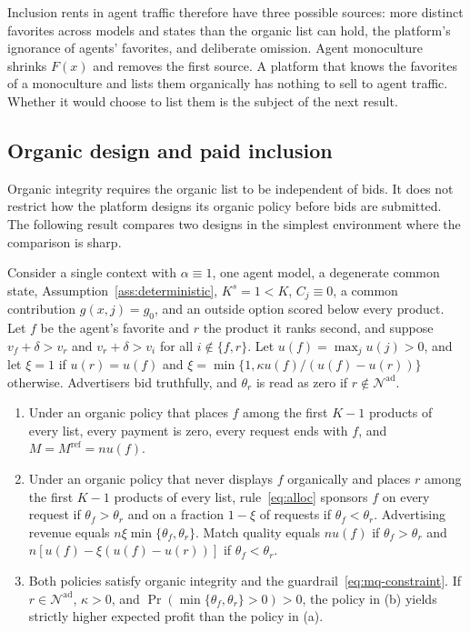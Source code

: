 \documentclass[opre,dblanonrev]{informs4}
\providecommand{\1}{\mathbf{1}}
\begin{document}
Inclusion rents in agent traffic therefore have three possible sources: more distinct favorites across models and states than the organic list can hold, the platform's ignorance of agents' favorites, and deliberate omission. Agent monoculture shrinks $F(x)$ and removes the first source. A platform that knows the favorites of a monoculture and lists them organically has nothing to sell to agent traffic. Whether it would choose to list them is the subject of the next result.

\subsection{Organic design and paid inclusion}\label{sec:mechanism-gating}

Organic integrity requires the organic list to be independent of bids. It does not restrict how the platform designs its organic policy before bids are submitted. The following result compares two designs in the simplest environment where the comparison is sharp.

\begin{proposition}\label{prop:gating}
Consider a single context with $\alpha\equiv1$, one agent model, a degenerate common state, Assumption~\ref{ass:deterministic}, $K^s=1<K$, $C_j\equiv0$, a common contribution $g(x,j)=g_0$, and an outside option scored below every product. Let $f$ be the agent's favorite and $r$ the product it ranks second, and suppose $v_f+\delta>v_r$ and $v_r+\delta>v_i$ for all $i\notin\{f,r\}$. Let $u(f)=\max_ju(j)>0$, and let $\xi=1$ if $u(r)=u(f)$ and $\xi=\min\{1,\kappa u(f)/(u(f)-u(r))\}$ otherwise. Advertisers bid truthfully, and $\theta_r$ is read as zero if $r\notin\mathcal N^{\mathrm{ad}}$.
\begin{enumerate}
\item[(a)] Under an organic policy that places $f$ among the first $K-1$ products of every list, every payment is zero, every request ends with $f$, and $M=M^{\mathrm{ref}}=nu(f)$.
\item[(b)] Under an organic policy that never displays $f$ organically and places $r$ among the first $K-1$ products of every list, rule~\eqref{eq:alloc} sponsors $f$ on every request if $\theta_f>\theta_r$ and on a fraction $1-\xi$ of requests if $\theta_f<\theta_r$. Advertising revenue equals $n\xi\min\{\theta_f,\theta_r\}$. Match quality equals $nu(f)$ if $\theta_f>\theta_r$ and $n[u(f)-\xi(u(f)-u(r))]$ if $\theta_f<\theta_r$.
\item[(c)] Both policies satisfy organic integrity and the guardrail~\eqref{eq:mq-constraint}. If $r\in\mathcal N^{\mathrm{ad}}$, $\kappa>0$, and $\Pr(\min\{\theta_f,\theta_r\}>0)>0$, the policy in (b) yields strictly higher expected profit than the policy in (a).
\end{enumerate}
\end{proposition}
\end{document}
